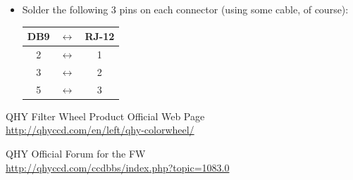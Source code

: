 \documentclass[a4paper,10pt]{article}
\begin{document}
\begin{itemize}
  \item Solder the following 3 pins on each connector (using some cable, of course):
  
  \begin{table}[h]
  \centering
\begin{tabular}{ | c c c | }
\hline
  \textbf{DB9} & $\longleftrightarrow$ & \textbf{RJ-12} \\ \hline \hline
  2 & $\longleftrightarrow$ & 1  \\ \hline
  3 & $\longleftrightarrow$ & 2  \\ \hline
  5 & $\longleftrightarrow$ & 3  \\ \hline
\end{tabular}
  \end{table}

\end{itemize}


\begin{thebibliography}{9}

  QHY Filter Wheel Product Official Web Page \\ \url{http://qhyccd.com/en/left/qhy-colorwheel/}
  
  QHY Official Forum for the FW \\ \url{http://qhyccd.com/ccdbbs/index.php?topic=1083.0}

\end{thebibliography}
\end{document}
